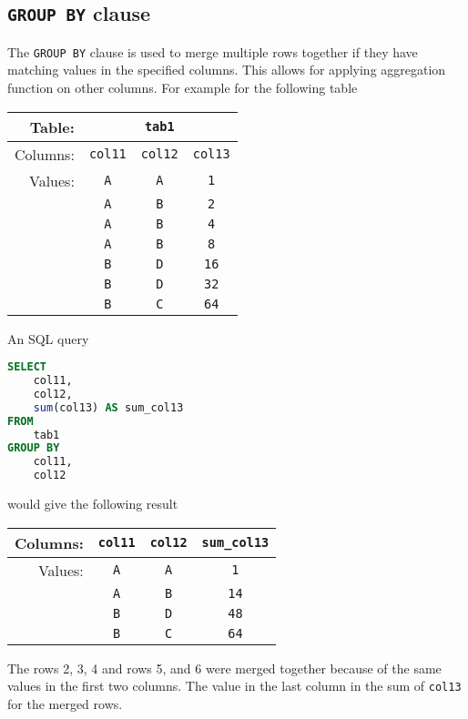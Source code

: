 \documentclass[magisterska,en]{pracamgr}
\newcommand{\code}[1]{\texttt{#1}}
\begin{document}
\subsection{\code{GROUP BY} clause}
The \code{GROUP BY} clause is used to merge multiple rows together if they have matching values in the specified columns. This allows for applying aggregation function on other columns. For example for the following table
\begin{center}
\begin{tabular}{r|c|c|c|}
     Table: & \multicolumn{3}{c|}{\code{tab1}} \\
     \hline
     Columns: & \code{col11} & \code{col12} & \code{col13} \\
     \hline
     Values: & \code{A} & \code{A} & \code{1}  \\
             & \code{A} & \code{B} & \code{2}  \\
             & \code{A} & \code{B} & \code{4}  \\
             & \code{A} & \code{B} & \code{8}  \\
             & \code{B} & \code{D} & \code{16} \\
             & \code{B} & \code{D} & \code{32} \\
             & \code{B} & \code{C} & \code{64}
\end{tabular}
\end{center}
An SQL query
\begin{lstlisting}[language=SQL]
SELECT
    col11,
    col12,
    sum(col13) AS sum_col13
FROM
    tab1
GROUP BY
    col11,
    col12
\end{lstlisting}
would give the following result
\begin{center}
\begin{tabular}{r|c|c|c|}
     Columns: & \code{col11} & \code{col12} & \code{sum_col13} \\
     \hline
     Values: & \code{A} & \code{A} & \code{1}  \\
             & \code{A} & \code{B} & \code{14} \\
             & \code{B} & \code{D} & \code{48} \\
             & \code{B} & \code{C} & \code{64}
\end{tabular}
\end{center}

The rows 2, 3, 4 and rows 5, and 6 were merged together because of the same values in the first two columns. The value in the last column in the sum of \code{col13} for the merged rows.
\end{document}
